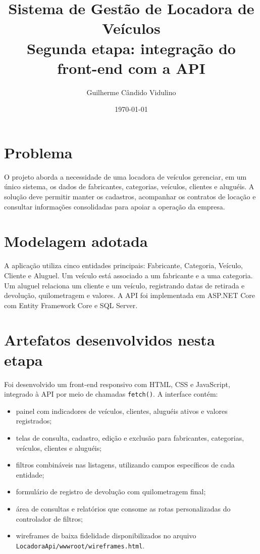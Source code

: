 \documentclass[12pt,a4paper]{article}
\title{Sistema de Gestão de Locadora de Veículos\\\large Segunda etapa: integração do front-end com a API}
\author{Guilherme Cândido Vidulino}
\date{\today}
\begin{document}
\maketitle

\section{Problema}
O projeto aborda a necessidade de uma locadora de veículos gerenciar, em um único sistema, os dados de fabricantes, categorias, veículos, clientes e aluguéis. A solução deve permitir manter os cadastros, acompanhar os contratos de locação e consultar informações consolidadas para apoiar a operação da empresa.

\section{Modelagem adotada}
A aplicação utiliza cinco entidades principais: Fabricante, Categoria, Veículo, Cliente e Aluguel. Um veículo está associado a um fabricante e a uma categoria. Um aluguel relaciona um cliente e um veículo, registrando datas de retirada e devolução, quilometragem e valores. A API foi implementada em ASP.NET Core com Entity Framework Core e SQL Server.

\section{Artefatos desenvolvidos nesta etapa}
Foi desenvolvido um front-end responsivo com HTML, CSS e JavaScript, integrado à API por meio de chamadas \texttt{fetch()}. A interface contém:
\begin{itemize}[noitemsep]
  \item painel com indicadores de veículos, clientes, aluguéis ativos e valores registrados;
  \item telas de consulta, cadastro, edição e exclusão para fabricantes, categorias, veículos, clientes e aluguéis;
  \item filtros combináveis nas listagens, utilizando campos específicos de cada entidade;
  \item formulário de registro de devolução com quilometragem final;
  \item área de consultas e relatórios que consome as rotas personalizadas do controlador de filtros;
  \item wireframes de baixa fidelidade disponibilizados no arquivo \texttt{LocadoraApi/wwwroot/wireframes.html}.
\end{itemize}
\end{document}
